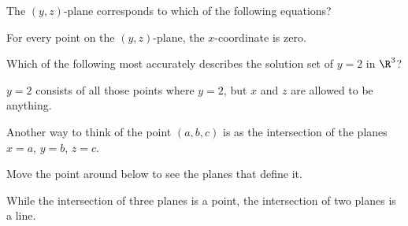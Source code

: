 \documentclass{ximera}
\begin{document}
\begin{question}
  The $(y,z)$-plane corresponds to which of the following
  equations?
  \begin{multipleChoice}
  \end{multipleChoice}
  \begin{hint}
    For every point on the $(y,z)$-plane, the $x$-coordinate is zero.
  \end{hint}
\end{question}

\begin{question}
  Which of the following most accurately describes the solution
  set of $y=2$ in $\R^3$?
  \begin{multipleChoice}
  \end{multipleChoice}
  \begin{hint}
    $y=2$ consists of all those points where $y=2$, but $x$ and
    $z$ are allowed to be anything.  
  \end{hint}
\end{question}


Another way to think of the point $(a,b,c)$ is as the intersection of the planes $x=a$, $y=b$, $z=c$. 
\begin{onlineOnly}
  Move the point around below to see the planes that define it.

  \begin{center}
  \end{center}
\end{onlineOnly}


While the intersection of three planes is a point, the intersection of
two planes is a line.
\end{document}
